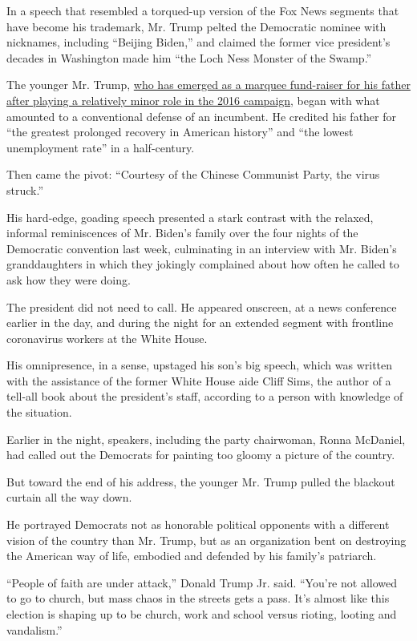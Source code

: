 In a speech that resembled a torqued-up version of the Fox News segments
that have become his trademark, Mr. Trump pelted the Democratic nominee
with nicknames, including ``Beijing Biden,'' and claimed the former vice
president's decades in Washington made him ``the Loch Ness Monster of
the Swamp.''

The younger Mr. Trump,
\href{https://www.nytimes3xbfgragh.onion/2020/08/24/magazine/donald-trump-jr.html?action=click\&module=Top\%20Stories\&pgtype=Homepage}{who
has emerged as a marquee fund-raiser for his father after playing a
relatively minor role in the 2016 campaign}, began with what amounted to
a conventional defense of an incumbent. He credited his father for ``the
greatest prolonged recovery in American history'' and ``the lowest
unemployment rate'' in a half-century.

Then came the pivot: ``Courtesy of the Chinese Communist Party, the
virus struck.''

His hard-edge, goading speech presented a stark contrast with the
relaxed, informal reminiscences of Mr. Biden's family over the four
nights of the Democratic convention last week, culminating in an
interview with Mr. Biden's granddaughters in which they jokingly
complained about how often he called to ask how they were doing.

The president did not need to call. He appeared onscreen, at a news
conference earlier in the day, and during the night for an extended
segment with frontline coronavirus workers at the White House.

His omnipresence, in a sense, upstaged his son's big speech, which was
written with the assistance of the former White House aide Cliff Sims,
the author of a tell-all book about the president's staff, according to
a person with knowledge of the situation.

Earlier in the night, speakers, including the party chairwoman, Ronna
McDaniel, had called out the Democrats for painting too gloomy a picture
of the country.

But toward the end of his address, the younger Mr. Trump pulled the
blackout curtain all the way down.

He portrayed Democrats not as honorable political opponents with a
different vision of the country than Mr. Trump, but as an organization
bent on destroying the American way of life, embodied and defended by
his family's patriarch.

``People of faith are under attack,'' Donald Trump Jr. said. ``You're
not allowed to go to church, but mass chaos in the streets gets a pass.
It's almost like this election is shaping up to be church, work and
school versus rioting, looting and vandalism.''

